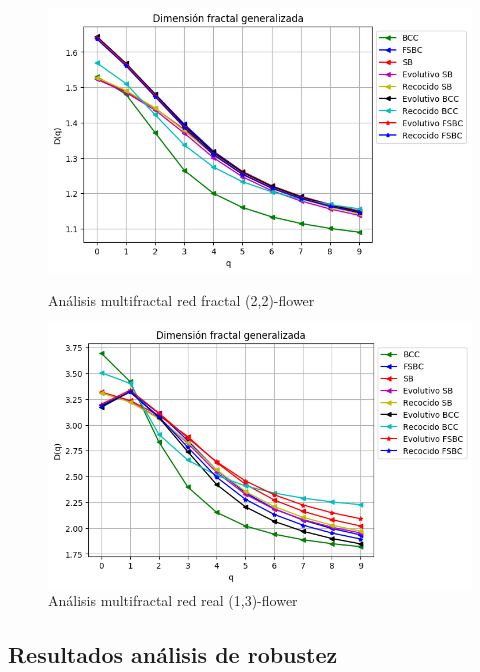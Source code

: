 \begin{figure}[!htb]
    \begin{minipage}{0.48\textwidth}
        \centering
        \includegraphics[scale=0.5]{CapituloAAnexos/imagenesAnexoC/Fractalidad/grafica_Dq20180511_101739floweru2v2.png}
        \caption{Análisis multifractal red fractal (2,2)-flower}
    \end{minipage}\hfill
   \begin{minipage}{0.48\textwidth}
         \centering
        \includegraphics[scale=0.5]{CapituloAAnexos/imagenesAnexoC/Fractalidad/grafica_Dq20180509_000454floweru1v3.png}
    \caption{Análisis multifractal red real (1,3)-flower}
    \end{minipage}
\end{figure}


\subsection*{Resultados análisis de robustez}


